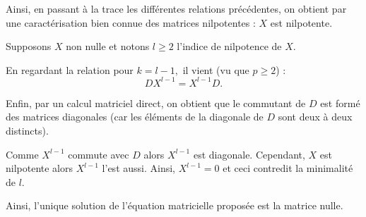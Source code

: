 Ainsi, en passant à la trace les différentes relations précédentes, on obtient par une caractérisation bien connue des matrices nilpotentes : $X$ est nilpotente.

Supposons $X$ non nulle et notons $l\geq 2$ l'indice de nilpotence de $X.$

En regardant la relation pour $k=l-1,$ il vient (vu que $p\geq 2$) : $$DX^{l-1}=X^{l-1}D.$$

Enfin, par un calcul matriciel direct, on obtient que le commutant de $D$ est formé des matrices diagonales (car les éléments de la diagonale de $D$ sont deux à deux distincts).

Comme $X^{l-1}$ commute avec $D$ alors $X^{l-1}$ est diagonale. Cependant, $X$ est nilpotente alors $X^{l-1}$ l'est aussi. Ainsi, $X^{l-1}=0$ et ceci contredit la minimalité de $l.$

Ainsi, l'unique solution de l'équation matricielle proposée est la matrice nulle.